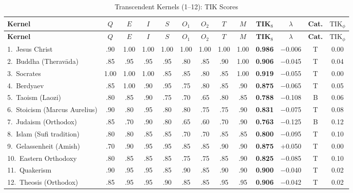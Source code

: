 \documentclass[11pt,a4paper]{article}
\theoremstyle{definition}
\theoremstyle{remark}
\newcommand{\TIKpharisee}{\text{TIK}_{\phi}}    %
\begin{document}
\begin{longtable}{@{}l|cccccccc|cc|cc@{}}
\caption{Transcendent Kernels (1--12): TIK Scores}
\label{tab:transcendent}\\
\toprule
\textbf{Kernel} &
$Q$ & $E$ & $I$ & $S$ & $O_1$ & $O_2$ & $T$ & $M$ &
\textbf{TIK$_8$} & $\lambda$ &
\textbf{Cat.} & $\TIKpharisee$ \\
\midrule
\endfirsthead
\toprule
\textbf{Kernel} &
$Q$ & $E$ & $I$ & $S$ & $O_1$ & $O_2$ & $T$ & $M$ &
\textbf{TIK$_8$} & $\lambda$ &
\textbf{Cat.} & $\TIKpharisee$ \\
\midrule
\endhead
\bottomrule
\endlastfoot

\rowcolor{survival!15}
1.\ Jesus Christ
  & .90 & 1.00 & 1.00 & 1.00 & 1.00 & 1.00 & 1.00 & 1.00
  & \textbf{0.986} & $-$0.006 & \textcolor{survival}{T} & 0.00 \\
\rowcolor{survival!10}
2.\ Buddha (Theravāda)
  & .85 & .95 & .95 & .95 & .80 & .85 & .90 & 1.00
  & \textbf{0.906} & $-$0.045 & \textcolor{survival}{T} & 0.04 \\
\rowcolor{survival!10}
3.\ Socrates
  & 1.00 & 1.00 & 1.00 & .85 & .85 & .80 & .85 & 1.00
  & \textbf{0.919} & $-$0.055 & \textcolor{survival}{T} & 0.00 \\
\rowcolor{survival!10}
4.\ Berdyaev
  & .85 & 1.00 & .90 & .95 & .75 & .80 & .85 & .90
  & \textbf{0.875} & $-$0.065 & \textcolor{survival}{T} & 0.05 \\
\rowcolor{survival!10}
5.\ Taoism (Laozi)
  & .80 & .85 & .90 & .75 & .70 & .65 & .80 & .85
  & \textbf{0.788} & $-$0.108 & \textcolor{borderline}{B} & 0.06 \\
\rowcolor{survival!10}
6.\ Stoicism (Marcus Aurelius)
  & .90 & .80 & .95 & .80 & .80 & .75 & .75 & .90
  & \textbf{0.831} & $-$0.075 & \textcolor{survival}{T} & 0.08 \\
\rowcolor{survival!10}
7.\ Judaism (Orthodox)
  & .85 & .70 & .90 & .80 & .65 & .60 & .70 & .90
  & \textbf{0.763} & $-$0.125 & \textcolor{borderline}{B} & 0.12 \\
\rowcolor{survival!10}
8.\ Islam (Sufi tradition)
  & .80 & .80 & .85 & .85 & .70 & .70 & .85 & .85
  & \textbf{0.800} & $-$0.095 & \textcolor{survival}{T} & 0.10 \\
\rowcolor{survival!10}
9.\ Gelassenheit (Amish)
  & .70 & .90 & .95 & .95 & .85 & .85 & .90 & .90
  & \textbf{0.875} & $+$0.050 & \textcolor{survival}{T} & 0.00 \\
\rowcolor{survival!10}
10.\ Eastern Orthodoxy
  & .80 & .85 & .85 & .85 & .75 & .75 & .85 & .90
  & \textbf{0.825} & $-$0.085 & \textcolor{survival}{T} & 0.10 \\
\rowcolor{survival!10}
11.\ Quakerism
  & .90 & .95 & .95 & .85 & .90 & .85 & .90 & .90
  & \textbf{0.900} & $-$0.040 & \textcolor{survival}{T} & 0.02 \\
\rowcolor{survival!10}
12.\ Theosis (Orthodox)
  & .85 & .95 & .95 & .90 & .85 & .85 & .95 & .95
  & \textbf{0.906} & $-$0.042 & \textcolor{survival}{T} & 0.02 \\

\end{longtable}
\end{document}
